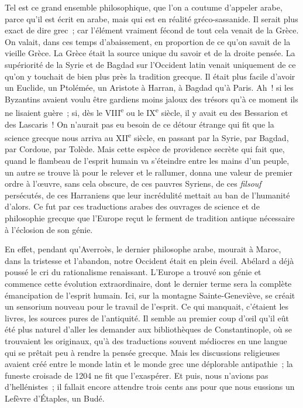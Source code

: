 \documentclass[french,twoside]{book} %
\newcommand\orgName[1]{#1}
\newcommand\persName[1]{#1}
\newcommand\placeName[1]{#1}
\begin{document}
Tel est ce grand ensemble philosophique, que l’on a coutume d’appeler arabe, parce qu’il est écrit en arabe, mais qui est en réalité gréco-sassanide. Il serait plus exact de dire grec ; car l’élément vraiment fécond de tout cela venait de la Grèce. On valait, dans ces temps d’abaissement, en proportion de ce qu’on savait de la vieille {\orgName Grèce}. La {\orgName Grèce} était la source unique du savoir et de la droite pensée. La supériorité de la {\orgName Syrie} et de {\orgName Bagdad} sur l’{\orgName Occident latin} venait uniquement de ce qu’on y touchait de bien plus près la tradition grecque. Il était plus facile d’avoir un {\persName Euclide}, un {\persName Ptolémée}, un {\persName Aristote} à {\placeName Harran}, à {\placeName Bagdad} qu’à {\placeName Paris}. Ah ! si les {\orgName Byzantins} avaient voulu être gardiens moins jaloux des trésors qu’à ce moment ils ne lisaient guère ; si, dès le VIII\textsuperscript{e} ou le IX\textsuperscript{e} siècle, il y avait eu des {\orgName Bessarion} et des {\orgName Lascaris} ! On n’aurait pas eu besoin de ce détour étrange qui fit que la science grecque nous arriva au XII\textsuperscript{e} siècle, en passant par la {\placeName Syrie}, par {\placeName Bagdad}, par {\placeName Cordoue}, par {\placeName Tolède}. Mais cette espèce de providence secrète qui fait que, quand le flambeau de l’esprit humain va s’éteindre entre les mains d’un peuple, un autre se trouve là pour le relever et le rallumer, donna une valeur de premier ordre à l’œuvre, sans cela obscure, de ces pauvres {\orgName Syriens}, de ces {\itshape filsouf} persécutés, de ces {\orgName Harraniens} que leur incrédulité mettait au ban de l’humanité d’alors. Ce fut par ces traductions arabes des ouvrages de science et de philosophie grecque que l’{\orgName Europe} reçut le ferment de tradition antique nécessaire à l’éclosion de son génie.\par
En effet, pendant qu’{\persName Averroès}, le dernier philosophe arabe, mourait à {\placeName Maroc}, dans la tristesse et l’abandon, notre {\orgName Occident} était en plein éveil. {\persName Abélard} a déjà poussé le cri du rationalisme renaissant. L’{\orgName Europe} a trouvé son génie et commence cette évolution extraordinaire, dont le dernier terme sera la complète émancipation de l’esprit humain. Ici, sur la {\placeName montagne Sainte-Geneviève}, se créait un sensorium nouveau pour le travail de l’esprit. Ce qui manquait, c’étaient les livres, les sources pures de l’antiquité. Il semble au premier coup d’œil qu’il eût été plus naturel d’aller les demander aux bibliothèques de {\placeName Constantinople}, où se trouvaient les originaux, qu’à des traductions souvent médiocres en une langue qui se prêtait peu à rendre la pensée grecque. Mais les discussions religieuses avaient créé entre le monde latin et le monde grec une déplorable antipathie ; la funeste croisade de 1204 ne fit que l’exaspérer. Et puis, nous n’avions pas d’hellénistes ; il fallait encore attendre trois cents ans pour que nous eussions un {\persName Lefèvre d’Étaples}, un {\persName Budé}.\par
\end{document}
